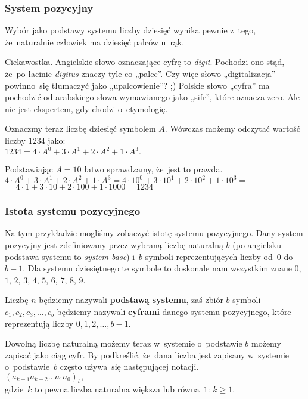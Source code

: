 \documentclass[10pt,t]{beamer}
\begin{document}
\begin{frame}
  \frametitle{System pozycyjny}


  Wybór jako podstawy systemu liczby dziesięć wynika pewnie z~tego,
  że~naturalnie człowiek ma dziesięć palców u~rąk.

  \alert{Ciekawostka.} Angielskie słowo oznaczające cyfrę to \textit{digit}.
  Pochodzi ono stąd, że~po łacinie \textit{digitus} znaczy tyle co „palec”.
  Czy więc słowo „digitalizacja” powinno~się tłumaczyć jako „upalcowienie”?
  ;) Polskie słowo „cyfra” ma pochodzić od arabskiego słowa wymawianego jako
  „sifr”, które oznacza zero. Ale nie jest ekspertem, gdy chodzi
  o~etymologię.

  Oznaczmy teraz liczbę dziesięć symbolem $A$. Wówczas możemy odczytać
  wartość liczby $1234$ jako: \\
  $\displaystyle
  1234 = 4 \cdot A^{ 0 } + 3 \cdot A^{ 1 } + 2 \cdot A^{ 2 } + 1 \cdot A^{ 3 }.$

  Podstawiając $A = 10$ łatwo sprawdzamy, że~jest to prawda. \\
  $\displaystyle
  4 \cdot A^{ 0 } + 3 \cdot A^{ 1 } + 2 \cdot A^{ 2 } + 1 \cdot A^{ 3 } =
  4 \cdot 10^{ 0 } + 3 \cdot 10^{ 1 } + 2 \cdot 10^{ 2 } + 1 \cdot 10^{ 3 } =$ \\
  $\displaystyle
  = 4 \cdot 1 + 3 \cdot 10 + 2 \cdot 100 + 1 \cdot 1 000 = 1234$

\end{frame}





\begin{frame}
  \frametitle{Istota systemu pozycyjnego}


  Na tym przykładzie mogliśmy zobaczyć istotę systemu pozycyjnego. Dany
  system pozycyjny jest zdefiniowany przez wybraną liczbę naturalną $b$
  (po angielsku podstawa systemu to \textit{system base}) i~$b$ symboli
  reprezentujących liczby od~$0$ do~$b - 1$. Dla systemu dziesiętnego te
  symbole to doskonale nam wszystkim znane $0$, $1$, $2$, $3$, $4$, $5$,
  $6$, $7$, $8$, $9$.

  Liczbę $n$ będziemy nazywali \textbf{podstawą systemu}, zaś zbiór $b$
  symboli $c_{ 1 }, c_{ 2 }, c_{ 3 }, \ldots, c_{ b }$ będziemy nazywali
  \textbf{cyframi}
  danego systemu pozycyjnego, które reprezentują liczby $0, 1, 2, \ldots, b - 1$.

  Dowolną liczbę naturalną możemy teraz w~systemie o~podstawie $b$ możemy
  zapisać jako ciąg cyfr. By podkreślić, że~dana liczba jest zapisany
  w~systemie o~podstawie~$b$ często używa~się następującej notacji. \\
  $\displaystyle
  ( a_{ k - 1 } a_{ k - 2 } \ldots a_{ 1 } a_{ 0 } )_{ b },$ \\
  gdzie~$k$ to pewna liczba naturalna większa lub równa~$1$: $k \geq 1$.

\end{frame}
\end{document}
